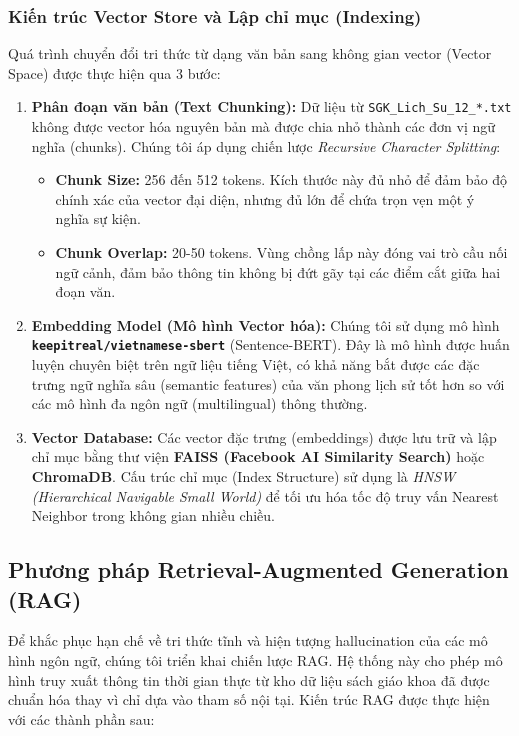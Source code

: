 \subsubsection{Kiến trúc Vector Store và Lập chỉ mục (Indexing)}
Quá trình chuyển đổi tri thức từ dạng văn bản sang không gian vector (Vector Space) được thực hiện qua 3 bước:
\begin{enumerate}
    \item \textbf{Phân đoạn văn bản (Text Chunking):}
    Dữ liệu từ \texttt{SGK\_Lich\_Su\_12\_*.txt} không được vector hóa nguyên bản mà được chia nhỏ thành các đơn vị ngữ nghĩa (chunks). Chúng tôi áp dụng chiến lược \textit{Recursive Character Splitting}:
    \begin{itemize}
        \item \textbf{Chunk Size:} 256 đến 512 tokens. Kích thước này đủ nhỏ để đảm bảo độ chính xác của vector đại diện, nhưng đủ lớn để chứa trọn vẹn một ý nghĩa sự kiện.
        \item \textbf{Chunk Overlap:} 20-50 tokens. Vùng chồng lấp này đóng vai trò cầu nối ngữ cảnh, đảm bảo thông tin không bị đứt gãy tại các điểm cắt giữa hai đoạn văn.
    \end{itemize}
    \item \textbf{Embedding Model (Mô hình Vector hóa):}
    Chúng tôi sử dụng mô hình \textbf{\texttt{keepitreal/vietnamese-sbert}} (Sentence-BERT). Đây là mô hình được huấn luyện chuyên biệt trên ngữ liệu tiếng Việt, có khả năng bắt được các đặc trưng ngữ nghĩa sâu (semantic features) của văn phong lịch sử tốt hơn so với các mô hình đa ngôn ngữ (multilingual) thông thường.
    
    \item \textbf{Vector Database:}
    Các vector đặc trưng (embeddings) được lưu trữ và lập chỉ mục bằng thư viện \textbf{FAISS (Facebook AI Similarity Search)} hoặc \textbf{ChromaDB}. Cấu trúc chỉ mục (Index Structure) sử dụng là \textit{HNSW (Hierarchical Navigable Small World)} để tối ưu hóa tốc độ truy vấn Nearest Neighbor trong không gian nhiều chiều.
\end{enumerate}
\subsection{Phương pháp Retrieval-Augmented Generation (RAG)}
\label{subsec:rag_implementation}
Để khắc phục hạn chế về tri thức tĩnh và hiện tượng hallucination của các mô hình ngôn ngữ, chúng tôi triển khai chiến lược RAG. Hệ thống này cho phép mô hình truy xuất thông tin thời gian thực từ kho dữ liệu sách giáo khoa đã được chuẩn hóa thay vì chỉ dựa vào tham số nội tại. 
Kiến trúc RAG được thực hiện với các thành phần sau:
